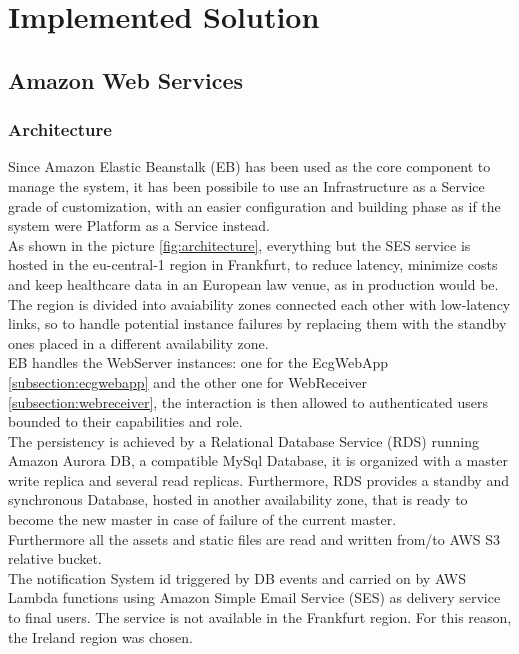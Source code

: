 \chapter{Implemented Solution}
\section{Amazon Web Services}

\subsection{Architecture}
Since Amazon Elastic Beanstalk (EB) has been used as the core component to manage the system, it has been possibile to use an Infrastructure as a Service grade of customization, with an easier configuration and building phase as if the system were Platform as a Service instead.\\
As shown in the picture \ref{fig:architecture}, everything but the SES service is hosted in the eu-central-1 region in Frankfurt, to reduce latency, minimize costs and keep healthcare data in an European law venue, as in production would be.
The region is divided into avaiability zones connected each other with low-latency links, so to handle potential instance failures by replacing them with the standby ones placed in a different availability zone.\\
EB handles the WebServer instances: one for the EcgWebApp \ref{subsection:ecgwebapp} and the other one for WebReceiver \ref{subsection:webreceiver}, the interaction is then allowed to authenticated users bounded to their capabilities and role.\\
The persistency is achieved by a Relational Database Service (RDS) running Amazon Aurora DB, a compatible MySql Database, it is organized with a master write replica and several read replicas.
Furthermore, RDS provides a standby and synchronous Database, hosted in another availability zone, that is ready to become the new master in case of failure of the current master.\\
Furthermore all the assets and static files are read and written from/to AWS S3 relative bucket.\\
The notification System id triggered by DB events and carried on by AWS Lambda functions using Amazon Simple Email Service (SES) as delivery service to final users. The service is not available in the Frankfurt region. For this reason, the Ireland region was chosen.



